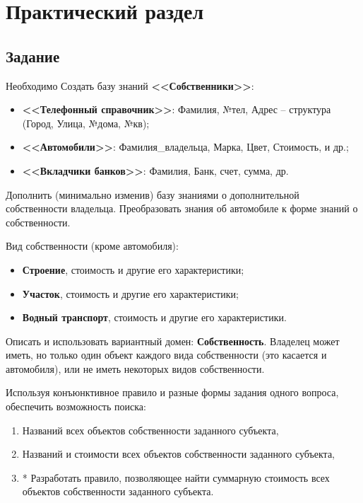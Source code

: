 \chapter{Практический раздел}

\section{Задание}

Необходимо Создать базу знаний \textbf{<<Собственники>>}:

\begin{itemize}
	\item \textbf{<<Телефонный справочник>>}: Фамилия, №тел, Адрес -- структура (Город, Улица, №дома, №кв);
	\item \textbf{<<Автомобили>>}: Фамилия\_владельца, Марка, Цвет, Стоимость, и др.;
	\item \textbf{<<Вкладчики банков>>}: Фамилия, Банк, счет, сумма, др.
\end{itemize}

Дополнить (минимально изменив) базу знаниями о дополнительной собственности владельца. Преобразовать знания об автомобиле к форме знаний о собственности.

Вид собственности (кроме автомобиля):

\begin{itemize}
	\item \textbf{Строение}, стоимость и другие его характеристики;
	\item \textbf{Участок}, стоимость и другие его характеристики;
	\item \textbf{Водный транспорт}, стоимость и другие его характеристики.
\end{itemize}

Описать и использовать вариантный домен: \textbf{Собственность}. Владелец может иметь, но только один объект каждого вида собственности (это касается и автомобиля), или не иметь некоторых видов собственности.

Используя конъюнктивное правило и разные формы задания одного вопроса, обеспечить возможность поиска:

\begin{enumerate}
	\item Названий всех объектов собственности заданного субъекта,
	\item Названий и стоимости всех объектов собственности заданного субъекта,
	\item * Разработать правило, позволяющее найти суммарную стоимость всех объектов собственности заданного субъекта.
\end{enumerate}


